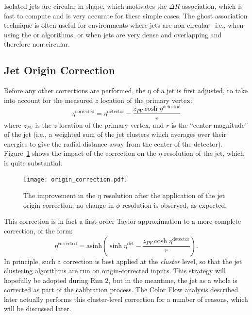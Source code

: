 Isolated \antikt jets are circular in shape, which motivates the $\Delta R$ association, which is fast to compute and is very accurate for these simple cases. The ghost association technique is often useful for environments where jets are non-circular-- i.e., when using the \kt or \ca algorithms, or when jets are very dense and overlapping and therefore non-circular.



\subsection{Jet Origin Correction}
\label{jet-reconstruction:origin}
Before any other corrections are performed, the $\eta$ of a jet is first adjusted, to take into account for the measured $z$ location of the primary vertex:
%
\begin{equation}
\eta^\mathrm{corrected} = \eta^\mathrm{detector} - \frac{z_{PV} \cosh \eta^\mathrm{detector} }{r}
\end{equation}
%
where $z_{PV}$ is the $z$ location of the primary vertex, and $r$ is the ``center-magnitude'' of the jet (i.e., a weighted sum of the jet clusters which averages over their energies to give the radial distance away from the center of the detector). Figure~\ref{fig:jet-reconstruction:origin_correction} shows the impact of the correction on the $\eta$ resolution of the jet, which is quite substantial.


\begin{figure}
\centering
\texttt{[image: origin\_correction.pdf]}
\label{fig:jet-reconstruction:origin_correction}
\caption{The improvement in the $\eta$ resolution after the application of the jet origin correction; no change in $\phi$ resolution is observed, as expected.}
\end{figure}


This correction is in fact a first order Taylor approximation to a more complete correction, of the form:
%
\begin{equation}
\eta^\mathrm{corrected} = \mathrm{asinh} \left(\sinh \eta^\mathrm{det} - \frac{z_{PV} \cosh \eta^\mathrm{detector}}{r}  \right).
\end{equation}
%
In principle, such a correction is best applied at the \textit{cluster} level, so that the jet clustering algorithms are run on origin-corrected inputs. This strategy will hopefully be adopted during Run 2, but in the meantime, the jet as a whole is corrected as part of the calibration process. The Color Flow analysis described later actually performs this cluster-level correction for a number of reasons, which will be discussed later.


